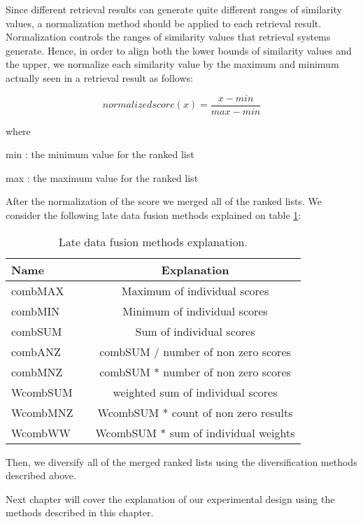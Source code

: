 Since different retrieval results can generate quite different ranges of similarity values, a normalization
method should be applied to each retrieval result. Normalization controls the ranges of similarity values that retrieval systems generate. Hence, in order to align both the lower bounds of similarity values and the upper, we normalize each similarity value
by the maximum and minimum actually seen in a retrieval result as follows:

\begin{equation}
normalized score(x) = \frac{x-min}{max-min}
\end{equation}

where

min : the minimum value for the ranked list

max : the maximum value for the ranked list

\bigskip

After the normalization of the score we merged all of the ranked lists. We consider the following late data fusion methods explained on table \ref{table:LDFmethods}:
\bigskip

\begin{table}[H]
\begin{center}
\caption{Late data fusion methods explanation.}
\label{table:LDFmethods}
\begin{tabular}{lcc}
\midrule
Name &   & Explanation \\
\midrule
combMAX &   & Maximum of individual scores \\
combMIN &   & Minimum of individual scores \\
combSUM &   & Sum of individual scores \\
combANZ &   & combSUM / number of non zero scores \\
combMNZ &   & combSUM * number of non zero scores \\
WcombSUM &   & weighted sum of individual scores \\
WcombMNZ &   & WcombSUM * count of non zero results \\
WcombWW &   & WcombSUM * sum of individual weights \\
\bottomrule
\end{tabular}
\end{center}
\end{table}

Then, we diversify all of the merged ranked lists using the diversification methods described above.

Next chapter will cover the explanation of our experimental design using the methods described in this chapter.